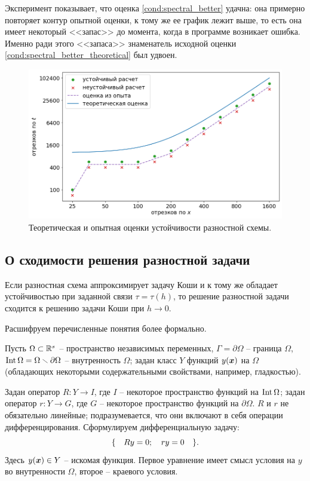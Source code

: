 Эксперимент показывает, что оценка \eqref{cond:spectral_better} удачна: она примерно повторяет контур опытной оценки, к тому же ее график лежит выше, то есть она имеет некоторый <<запас>> до момента, когда в программе возникает ошибка. Именно ради этого <<запаса>> знаменатель исходной оценки  \eqref{cond:spectral_better_theoretical} был удвоен.

\begin{figure}[!tp]
    \centering
    \includegraphics[width=\textwidth]{figures/stability_bounds.png}
    \vspace{-0.7cm}
    \caption{Теоретическая и опытная оценки устойчивости разностной схемы.}
    \label{fig:stability_bounds}
\end{figure}


\subsection{О сходимости решения разностной задачи}

Если разностная схема аппроксимирует задачу Коши и к тому же обладает устойчивостью при заданной связи $\tau =\tau(h)$, то решение разностной задачи сходится к решению задачи Коши при $h \to 0$.

Расшифруем перечисленные понятия более формально.

Пусть $\Omega \subset {\mathbb{R}}^s$ -- пространство независимых переменных, $\Gamma = \partial \Omega$ -- граница $\Omega$, $\operatorname{{Int}} \Omega = \Omega \smallsetminus \partial \Omega$ -- внутренность $\Omega$; задан класс $Y$ функций $y({\boldsymbol{x}})$ на $\Omega$ (обладающих некоторыми содержательными свойствами, например, гладкостью).

Задан оператор $R: Y \longrightarrow I$, где $I$ -- некоторое пространство функций на $\operatorname{{Int}} \Omega$; задан оператор $r: Y \longrightarrow G$, где $G$ -- некоторое пространство функций на $\partial \Omega$. $R$ и $r$ не обязательно линейные; подразумевается, что они включают в себя операции дифференцирования. Сформулируем дифференциальную задачу:
\begin{equation}
    \{ \quad Ry = 0; \quad ry = 0 \quad \} {\text{.}}
    \label{eq:formal_differential}
\end{equation}
Здесь $y({\boldsymbol{x}}) \in Y$ -- искомая функция. Первое уравнение имеет смысл условия на $y$ во внутренности $\Omega$, второе -- краевого условия.

